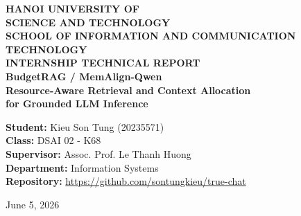 \begin{titlepage}
\thispagestyle{empty}
\centering
\textbf{\LARGE HANOI UNIVERSITY OF}\\[0.35cm]
\textbf{\LARGE SCIENCE AND TECHNOLOGY}\\[1.0cm]
\textbf{\Large SCHOOL OF INFORMATION AND COMMUNICATION TECHNOLOGY}\\[2.0cm]

\textbf{\Huge INTERNSHIP TECHNICAL REPORT}\\[0.75cm]
\textbf{\Large BudgetRAG / MemAlign-Qwen}\\[0.35cm]
\textbf{\large Resource-Aware Retrieval and Context Allocation}\\
\textbf{\large for Grounded LLM Inference}\\[1.5cm]

\vfill
\begin{flushleft}
\textbf{Student:} Kieu Son Tung (20235571)\\[0.25cm]
\textbf{Class:} DSAI 02 - K68\\[0.25cm]
\textbf{Supervisor:} Assoc. Prof. Le Thanh Huong\\[0.25cm]
\textbf{Department:} Information Systems\\[0.25cm]
\textbf{Repository:} \url{https://github.com/sontungkieu/true-chat}
\end{flushleft}

\vspace{1.0cm}
\centering
\large June 5, 2026
\end{titlepage}
\newpage
{}

